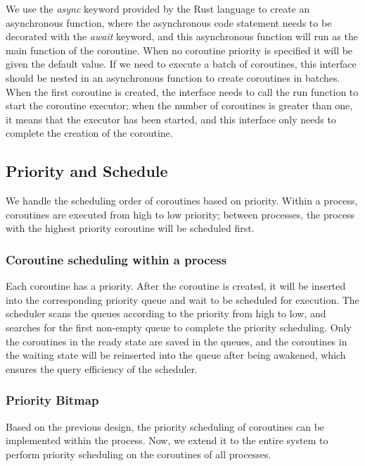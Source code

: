 \documentclass[conference]{IEEEtran}
\begin{document}
We use the \emph{async} keyword provided by the Rust language to create an asynchronous function, where the asynchronous code statement needs to be decorated with the \emph{await} keyword, and this asynchronous function will run as the main function of the coroutine. When no coroutine priority is specified it will be given the default value. If we need to execute a batch of coroutines, this interface should be nested in an asynchronous function to create coroutines in batches. When the first coroutine is created, the interface needs to call the run function to start the coroutine executor; when the number of coroutines is greater than one, it means that the executor has been started, and this interface only needs to complete the creation of the coroutine.

\subsection{Priority and Schedule}

We handle the scheduling order of coroutines based on priority. Within a process, coroutines are executed from high to low priority; between processes, the process with the highest priority coroutine will be scheduled first. 

\subsubsection{Coroutine scheduling within a process}

Each coroutine has a priority. After the coroutine is created, it will be inserted into the corresponding priority queue and wait to be scheduled for execution. The scheduler scans the queues according to the priority from high to low, and searches for the first non-empty queue to complete the priority scheduling. Only the coroutines in the ready state are saved in the queues, and the coroutines in the waiting state will be reinserted into the queue after being awakened, which ensures the query efficiency of the scheduler.

\subsubsection{Priority Bitmap}

Based on the previous design, the priority scheduling of coroutines can be implemented within the process. Now, we extend it to the entire system to perform priority scheduling on the coroutines of all processes.
\end{document}
